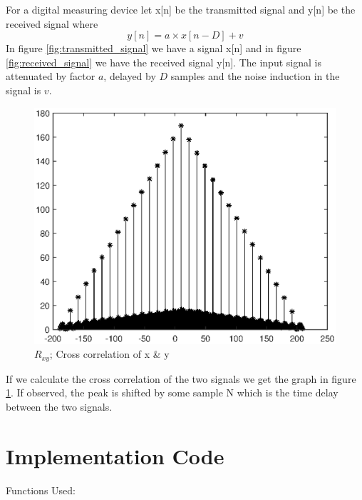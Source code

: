 \documentclass[a4paper,11pt]{article}
\begin{document}
	For a digital measuring device let x[n] be the transmitted signal and y[n] be the received signal where
	$$ y[n] = a \times x[n-D] + v $$ 
	In figure \ref{fig:transmitted_signal} we have a signal x[n] and in figure \ref{fig:received_signal} we have the received signal y[n]. The input signal is attenuated by factor $a$, delayed by $D$ samples and the noise induction in the signal is $v$.
	\begin{figure}[h!]
		\centering
		\includegraphics[scale=0.5]{rxy.eps}
		\caption{$R_{xy}$; Cross correlation of x \& y}
		\label{fig:rxy}
	\end{figure}
	
	If we calculate the cross correlation of the two signals we get the graph in figure \ref{fig:rxy}. If observed, the peak is shifted by some sample N which is the time delay between the two signals.
	
	\section*{Implementation Code}  
	\captionsetup{labelformat=empty,labelsep=none}
	
	\vspace{1.5cm}
	\large Functions Used:
	
	
	
	
	
	
	
	
	
\end{document}
